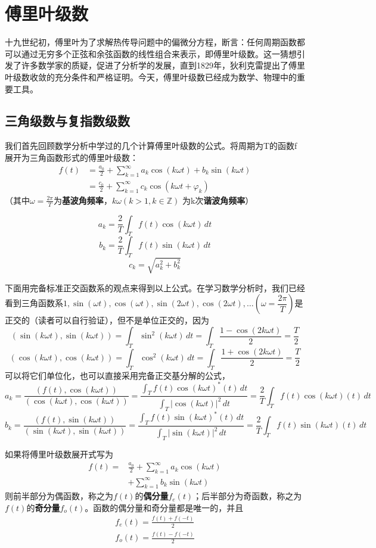 \section{傅里叶级数}\label{sec:Fourier_Series}

十九世纪初，傅里叶为了求解热传导问题中的偏微分方程，断言：任何周期函数都可以通过无穷多个正弦和余弦函数的线性组合来表示，即傅里叶级数。这一猜想引发了许多数学家的质疑，促进了分析学的发展，直到1829年，狄利克雷提出了傅里叶级数收敛的充分条件和严格证明。今天，傅里叶级数已经成为数学、物理中的重要工具。

\subsection{三角级数与复指数级数}\label{sub:tri_exp_series}
我们首先回顾数学分析中学过的几个计算傅里叶级数的公式。将周期为T的函数f展开为三角函数形式的傅里叶级数：
\begin{align*}
    f(t) & =\frac{a_0}{2}+\sum_{k = 1}^{\infty} a_k \cos(k\omega t)+b_k\sin(k\omega t) \\
         & =\frac{c_0}{2}+\sum_{k = 1}^{\infty} c_k\cos(k\omega t+\varphi _k)
\end{align*}
（其中$\omega =\frac{2\pi }{T}$为\textbf{基波角频率}，$k\omega (k>1,k\in \mathbb{Z} )$
为k次\textbf{谐波角频率}）
\begin{claim}[三角函数形式的傅里叶系数公式]
\[a_k=\frac{2}{T}\int_T f(t)\cos(k\omega t)\,dt\]
\[b_k=\frac{2}{T}\int_T f(t)\sin(k\omega t)\,dt\]
\[c_k=\sqrt{a_k^2+b_k^2}\]
\end{claim}
下面用完备标准正交函数系的观点来得到以上公式。在学习数学分析时，我们已经看到三角函数系$1,\sin(\omega t),\cos(\omega t),\sin(2\omega t),\cos(2\omega t),\dots\left(\omega =\dfrac{2\pi}{T}\right)$是正交的（读者可以自行验证），但不是单位正交的，因为
\[(\sin(k\omega t),\sin(k\omega t))=\int_{T}\sin^2(k\omega t)\,dt=\int_{T}\frac{1-\cos(2k\omega t)}{2}=\frac{T}{2}\]
\[(\cos(k\omega t),\cos(k\omega t))=\int_{T}\cos^2(k\omega t)\,dt=\int_{T}\frac{1+\cos(2k\omega t)}{2}=\frac{T}{2}\]
可以将它们单位化，也可以直接采用完备正交基分解的公式，
\[a_k=\frac{(f(t),\cos(k\omega t))}{(\cos(k\omega t),\cos(k\omega t))}=\frac{\int_{T}f(t)\cos(k\omega t)^*(t)\,dt}{\int_{T}|\cos(k\omega t)|^2\,dt}
    =\frac{2}{T}\int_{T}f(t)\cos(k\omega t)(t)\,dt\]
\[b_k=\frac{(f(t),\sin(k\omega t))}{(\sin(k\omega t),\sin(k\omega t))}=\frac{\int_{T}f(t)\sin(k\omega t)^*(t)\,dt}{\int_{T}|\sin(k\omega t)|^2\,dt}
    =\frac{2}{T}\int_{T}f(t)\sin(k\omega t)(t)\,dt\]

如果将傅里叶级数展开式写为
\begin{align*}
    f(t) = & \frac{a_0}{2}+\sum_{k = 1}^{\infty} a_k \cos(k\omega t) \\
           & +\sum_{k = 1}^{\infty} b_k \sin(k\omega t)
\end{align*}
则前半部分为偶函数，称之为$f(t)$的\textbf{偶分量}$f_e(t)$；后半部分为奇函数，称之为$f(t)$的\textbf{奇分量}$f_o(t)$。函数的偶分量和奇分量都是唯一的，并且\begin{align*}
    f_e(t)=\frac{f(t)+f(-t)}{2} \\
    f_o(t)=\frac{f(t)-f(-t)}{2}
\end{align*}

